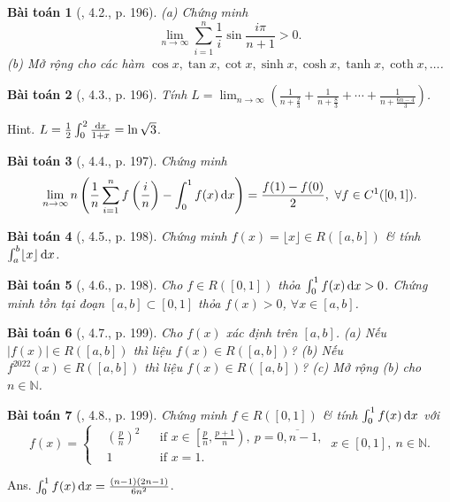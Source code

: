 \documentclass{article}
\newtheorem{baitoan}{Bài toán}
\begin{document}
\begin{baitoan}[\cite{Quoc_Long_Dat_Nam_VMC}, 4.2., p. 196]
	(a) Chứng minh
	\begin{equation*}
		\lim_{n\to\infty} \sum_{i=1}^{n} \frac{1}{i}\sin\frac{i\pi}{n + 1} > 0.
	\end{equation*}
	(b) Mở rộng cho các hàm $\cos x,\tan x,\cot x,\sinh x,\cosh x,\tanh x,\coth x,\ldots$.
\end{baitoan}

\begin{baitoan}[\cite{Quoc_Long_Dat_Nam_VMC}, 4.3., p. 196]
	Tính $L = \lim_{n\to\infty} \left(\frac{1}{n + \frac{2}{3}} + \frac{1}{n + \frac{8}{3}} + \cdots + \frac{1}{n + \frac{6n - 4}{3}}\right)$.
\end{baitoan}
{\sf Hint.} $L = \frac{1}{2}\int_0^2 \frac{{\rm d}x}{1 + x} = \ln\sqrt{3}$.

\begin{baitoan}[\cite{Quoc_Long_Dat_Nam_VMC}, 4.4., p. 197]
	Chứng minh
	\begin{equation*}
		\lim_{n\to\infty} n\left(\frac{1}{n}\sum_{i=1}^n f\left(\frac{i}{n}\right) - \int_0^1 f(x)\,{\rm d}x\right) = \frac{f(1) - f(0)}{2},\ \forall f\in C^1([0,1]).
	\end{equation*}
\end{baitoan}

\begin{baitoan}[\cite{Quoc_Long_Dat_Nam_VMC}, 4.5., p. 198]
	Chứng minh $f(x) = \lfloor x\rfloor\in R([a,b])$ \& tính $\int_a^b \lfloor x\rfloor\,{\rm d}x$.
\end{baitoan}

\begin{baitoan}[\cite{Quoc_Long_Dat_Nam_VMC}, 4.6., p. 198]
	Cho $f\in R([0,1])$ thỏa $\int_0^1 f(x)\,{\rm d}x > 0$. Chứng minh tồn tại đoạn $[a,b]\subset[0,1]$ thỏa $f(x) > 0$, $\forall x\in[a,b]$.
\end{baitoan}

\begin{baitoan}[\cite{Quoc_Long_Dat_Nam_VMC}, 4.7., p. 199]
	Cho $f(x)$ xác định trên $[a,b]$. (a) Nếu $|f(x)|\in R([a,b])$ thì liệu $f(x)\in R([a,b])$? (b) Nếu $f^{2022}(x)\in R([a,b])$ thì liệu $f(x)\in R([a,b])$? (c) Mở rộng (b) cho $n\in\mathbb{N}$.
\end{baitoan}

\begin{baitoan}[\cite{Quoc_Long_Dat_Nam_VMC}, 4.8., p. 199]
	Chứng minh $f\in R([0,1])$ \& tính $\int_0^1 f(x)\,{\rm d}x$ với
	\begin{equation*}
		f(x) = \left\{\begin{split}
			&\left(\frac{p}{n}\right)^2&&\mbox{if } x\in\left[\frac{p}{n},\frac{p + 1}{n}\right),\ p = \overline{0,n-1},\\
			&1&&\mbox{if } x = 1.
		\end{split}\right.\ x\in[0,1],\ n\in\mathbb{N}.
	\end{equation*}
\end{baitoan}
{\sf Ans.} $\int_0^1 f(x)\,{\rm d}x = \frac{(n - 1)(2n - 1)}{6n^2}$.
\end{document}

